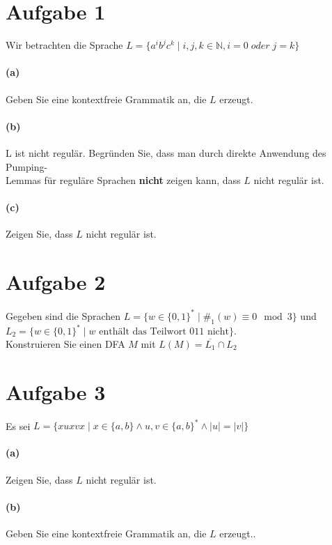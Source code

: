 \documentclass[titlepage]{article}
\renewcommand{\]}{\right]}
\renewcommand{\[}{\left[}
\renewcommand{\)}{\right)}
\renewcommand{\(}{\left(}
\renewcommand{\|}{\;|\;}
\begin{document}
\begingroup\let\clearpage\relax
	
	
	\section*{Aufgabe 1}
	Wir betrachten die Sprache $L=\{a^ib^jc^k\mid i,j,k\in\mathbb{N},i=0\;oder\;j=k\}$
		\paragraph{(a)} Geben Sie eine kontextfreie Grammatik an, die $L$ erzeugt.
		\paragraph{(b)} L ist nicht regulär. Begründen Sie, dass man durch direkte Anwendung des Pumping-\\Lemmas für reguläre Sprachen \textbf{nicht} zeigen kann, dass $L$ nicht regulär ist.
		\paragraph{(c)} Zeigen Sie, dass $L$ nicht regulär ist.
	\section*{Aufgabe 2}Gegeben sind die Sprachen $L=\{w\in\{0,1\}^*\mid\#_1(w)\equiv0\mod3\}$ und\\ $L_2=\{w\in\{0,1\}^*\mid w\text{ enthält das Teilwort 011 nicht}\}.$ \\Konstruieren Sie einen DFA $M$ mit $L(M)=\overline{L_1}\cap L_2$
	
	\section*{Aufgabe 3} Es sei $L=\{xuxvx\mid x\in\{a,b\}\land u,v\in\{a,b\}^*\land\mid u\mid=\mid v\mid\}$
		\paragraph{(a)} Zeigen Sie, dass $L$ nicht regulär ist.
		\paragraph{(b)} Geben Sie eine kontextfreie Grammatik an, die $L$ erzeugt..

\endgroup
\end{document}
